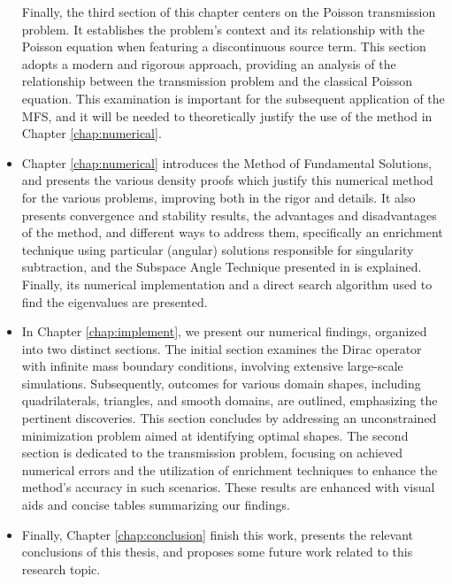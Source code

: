 \begin{itemize}
Finally, the third section of this chapter centers on the Poisson transmission problem. It establishes the problem's context and its relationship with the Poisson equation when featuring a discontinuous source term. This section adopts a modern and rigorous approach, providing an analysis of the relationship between the transmission problem and the classical Poisson equation. This examination is important for the subsequent application of the \ac{MFS}, and it will be needed to theoretically justify the use of the method in Chapter \ref{chap:numerical}.
\item Chapter \ref{chap:numerical} introduces the Method of Fundamental Solutions, and presents the various density proofs which justify this numerical method for the various problems, improving both in the rigor and details. It also presents convergence and stability results, the advantages and disadvantages of the method, and different ways to address them, specifically an enrichment technique using particular (angular) solutions responsible for singularity subtraction, and the Subspace Angle Technique presented in \cite{betcke2005reviving} is explained. Finally, its numerical implementation and a direct search algorithm used to find the eigenvalues are presented.
\item In Chapter \ref{chap:implement}, we present our numerical findings, organized into two distinct sections. The initial section examines the Dirac operator with infinite mass boundary conditions, involving extensive large-scale simulations. Subsequently, outcomes for various domain shapes, including quadrilaterals, triangles, and smooth domains, are outlined, emphasizing the pertinent discoveries. This section concludes by addressing an unconstrained minimization problem aimed at identifying optimal shapes. The second section is dedicated to the transmission problem, focusing on achieved numerical errors and the utilization of enrichment techniques to enhance the method's accuracy in such scenarios. These results are enhanced with visual aids and concise tables summarizing our findings.
\item Finally, Chapter \ref{chap:conclusion} finish this work, presents the relevant conclusions of this thesis, and proposes some future work related to this research topic.
\end{itemize}


